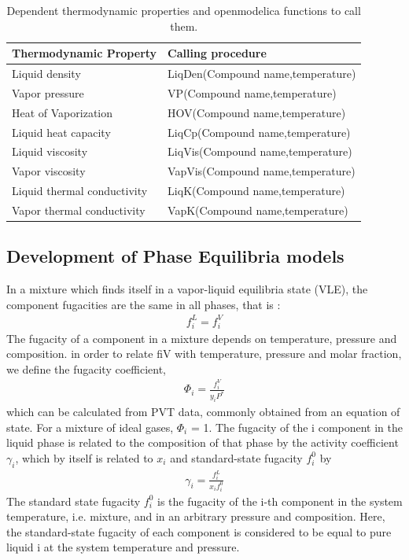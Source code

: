 \documentclass[12pt]{report}
\begin{document}
\begin{table}
\centering
\caption {Dependent thermodynamic properties and openmodelica functions to call them.}
\label{tab:depprop}
\vspace{1ex}
\begin{tabular}{l|l} \hline
Thermodynamic Property & Calling procedure \\ \hline
Liquid density & LiqDen(Compound name,temperature) \\
Vapor pressure & VP(Compound name,temperature) \\
Heat of Vaporization & HOV(Compound name,temperature) \\
Liquid heat capacity & LiqCp(Compound name,temperature) \\
Liquid viscosity & LiqVis(Compound name,temperature) \\
Vapor viscosity & VapVis(Compound name,temperature) \\
Liquid thermal conductivity & LiqK(Compound name,temperature) \\
Vapor thermal conductivity & VapK(Compound name,temperature) \\ \hline
\end{tabular}
\end{table}

\subsection{Development of Phase Equilibria models}
In a mixture which finds itself in a vapor-liquid equilibria state (VLE), the component fugacities are the same in all phases, that is :
\begin{align*}
f_i^L = f_i^V 
\end{align*}
The fugacity of a component in a mixture depends on temperature, pressure and composition. in order to relate fiV with temperature, pressure and molar fraction, we define the fugacity coefficient,
\begin{align*}
\Phi_i = \frac{f_i^V}{y_iP^*}
\end{align*}
which can be calculated from PVT data, commonly obtained from an equation of state. For a mixture of ideal gases, $\Phi_i$ = 1.
The fugacity of the i component in the liquid phase is related to the composition of that phase by the activity coefficient $\gamma_i$, which by itself is related to $x_i$ and standard-state fugacity $f_i^0$ by
\begin{align*}
\gamma_i = \frac{f_i^L}{x_if_i^0}
\end{align*}
The standard state fugacity $f_i^0$ is the fugacity of the i-th component in the system temperature, i.e. mixture, and in an arbitrary pressure and composition. Here, the standard-state fugacity of each component is considered to be equal to pure liquid i at the system temperature and pressure.
\end{document}
